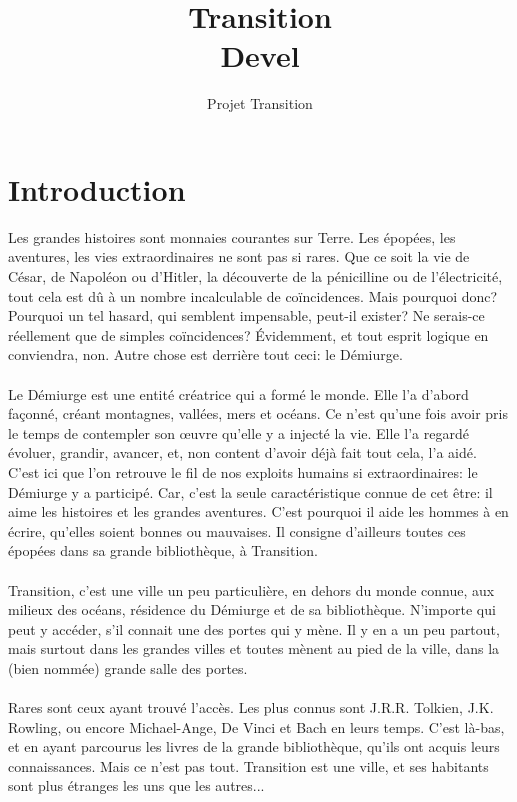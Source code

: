 \documentclass{book}
\title{Transition \\ Devel}
\author{Projet Transition}
\date{\oldstylenums{\insertdate}}
\begin{document}
\maketitle
\setcounter{tocdepth}{1} %
\renewcommand{\contentsname}{Sommaire} 
\tableofcontents

\newpage
\section*{Introduction}
Les grandes histoires sont monnaies courantes sur Terre. Les épopées, les aventures, les vies extraordinaires ne sont pas si rares. Que ce soit la  vie de César, de Napoléon ou d'Hitler, la découverte de la pénicilline ou de l’électricité, tout cela est dû à un nombre incalculable de coïncidences. Mais pourquoi donc? Pourquoi un tel hasard, qui semblent impensable, peut-il exister? Ne serais-ce réellement que de simples coïncidences?
Évidemment, et tout esprit logique en conviendra, non. Autre chose est derrière tout ceci: le Démiurge.
\\
\\
Le Démiurge est une entité créatrice qui a formé le monde. Elle l'a d'abord façonné, créant montagnes, vallées, mers et océans. Ce n'est qu'une fois avoir pris le temps de contempler son œuvre qu'elle y a injecté la vie. Elle l'a regardé évoluer, grandir, avancer, et, non content d'avoir déjà fait tout cela, l'a aidé.
\\
C'est ici que l'on retrouve le fil de nos exploits humains si extraordinaires: le Démiurge y a participé. Car, c'est la seule caractéristique connue de cet être: il aime les histoires et les grandes aventures. C'est pourquoi il aide les hommes à en écrire, qu'elles soient bonnes ou mauvaises.
Il consigne d'ailleurs toutes ces épopées dans sa grande bibliothèque, à Transition.
\\
\\
Transition, c'est une ville un peu particulière, en dehors du monde connue, aux milieux des océans, résidence du Démiurge et de sa bibliothèque. N'importe qui peut y accéder, s'il connait une des portes qui y mène. Il y en a un peu partout, mais surtout dans les grandes villes et toutes mènent au pied de la ville, dans la (bien nommée) grande salle des portes.
\\
\\
Rares sont ceux ayant trouvé l'accès. Les plus connus sont J.R.R. Tolkien, J.K. Rowling, ou encore Michael-Ange, De Vinci et Bach en leurs temps. C'est là-bas, et en ayant parcourus les livres de la grande bibliothèque, qu'ils ont acquis leurs connaissances. Mais ce n'est pas tout. Transition est une ville, et ses habitants sont plus étranges les uns que les autres...
\end{document}
